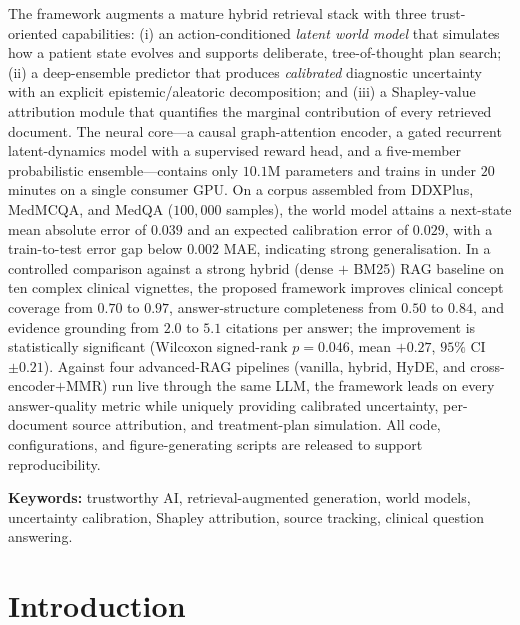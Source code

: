 \documentclass[11pt,a4paper]{report}
\begin{document}
The framework augments a mature hybrid retrieval stack with three trust-oriented
capabilities: (i) an action-conditioned \emph{latent world model} that simulates
how a patient state evolves and supports deliberate, tree-of-thought plan
search; (ii) a deep-ensemble predictor that produces \emph{calibrated}
diagnostic uncertainty with an explicit epistemic/aleatoric decomposition; and
(iii) a Shapley-value attribution module that quantifies the marginal
contribution of every retrieved document. The neural core---a causal
graph-attention encoder, a gated recurrent latent-dynamics model with a
supervised reward head, and a five-member probabilistic ensemble---contains only
$10.1$M parameters and trains in under $20$ minutes on a single consumer GPU. On
a corpus assembled from DDXPlus, MedMCQA, and MedQA ($100{,}000$ samples), the
world model attains a next-state mean absolute error of $0.039$ and an expected
calibration error of $0.029$, with a train-to-test error gap below $0.002$ MAE,
indicating strong generalisation. In a controlled comparison against a strong
hybrid (dense $+$ BM25) RAG baseline on ten complex clinical vignettes, the
proposed framework improves clinical concept coverage from $0.70$ to $0.97$,
answer-structure completeness from $0.50$ to $0.84$, and evidence grounding from
$2.0$ to $5.1$ citations per answer; the improvement is statistically
significant (Wilcoxon signed-rank $p=0.046$, mean $+0.27$, $95\%$ CI $\pm0.21$).
Against four advanced-RAG pipelines (vanilla, hybrid, HyDE, and
cross-encoder$+$MMR) run live through the same LLM, the framework leads on every
answer-quality metric while uniquely providing calibrated uncertainty,
per-document source attribution, and treatment-plan simulation.
All code, configurations, and figure-generating scripts are released to support
reproducibility.

\vspace{0.5em}
\noindent\textbf{Keywords:} trustworthy AI, retrieval-augmented generation,
world models, uncertainty calibration, Shapley attribution, source tracking,
clinical question answering.

\tableofcontents

\chapter{Introduction}
\end{document}
